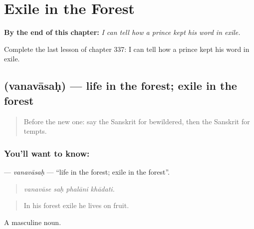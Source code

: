
\chapter{Exile in the Forest}
\label{ch:sa-exile-in-the-forest}

\begin{chapteropening}
\textbf{By the end of this chapter:} \emph{I can tell how a prince kept his word in exile.}

Complete the last lesson of chapter 337: I can tell how a prince kept his word in exile.
\end{chapteropening}

\section[\texorpdfstring{\sk{वनवासः} (vanavāsaḥ)}{वनवासः (vanavāsaḥ)}]{ (vanavāsaḥ) — life in the forest; exile in the forest}

\label{lesson:SA-C337-vanavasah}



\begin{quote}
Before the new one: say the Sanskrit for bewildered, then the Sanskrit for tempts.
\end{quote}

\subsection*{You'll want to know: }
\textbf{} — \emph{vanavāsaḥ} — \textquotedblleft{}life in the forest; exile in the forest\textquotedblright{}.

\begin{quote}
   
\end{quote}

\begin{quote}
\emph{vanavāse saḥ phalāni khādati.}
\end{quote}

\begin{quote}
In his forest exile he lives on fruit.
\end{quote}

A masculine noun.

